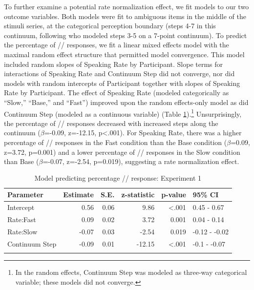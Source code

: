 To further examine a potential rate normalization effect, we fit models to our two outcome variables. Both models were fit to ambiguous items in the middle of the stimuli series, at the categorical perception boundary (steps 4-7 in this continuum, following \citet{bidelmanAcousticNoiseVision2019} who modeled steps 3-5 on a 7-point continuum). To predict the percentage of /\textesh/ responses, we fit a linear mixed effects model with the maximal random effect structure that permitted model convergence. This model included random slopes of Speaking Rate by Participant. Slope terms for interactions of Speaking Rate and Continuum Step did not converge, nor did models with random intercepts of Participant together with slopes of Speaking Rate by Participant. The effect of Speaking Rate (modeled categorically as ``Slow,'' ``Base,'' and ``Fast'') improved upon the random effects-only model as did Continuum Step (modeled as a continuous variable) (Table \ref{tab:exp1-sh-percen-model-summary}).\footnote{In the random effects, Continuum Step was modeled as three-way categorical variable; these models did not converge.} Unsurprisingly, the percentage of /\textesh/ responses decreased with increased steps along the continuum (\(\beta\)=-0.09, z=-12.15, p\textless.001). For Speaking Rate, there was a higher percentage of /\textesh/ responses in the Fast condition than the Base condition (\(\beta\)=0.09, z=3.72, p=0.001) and a lower percentage of /\textesh/ responses in the Slow condition than Base (\(\beta\)=-0.07, z=-2.54, p=0.019), suggesting a rate normalization effect.

\begin{table}
\caption{\label{tab:exp1-sh-percen-model-summary}Model predicting percentage /\textesh/ response: Experiment 1}
\centering
\begin{tabular}[t]{lrrrrl}
\hline\noalign{\smallskip}
Parameter & Estimate & S.E. & z-statistic & p-value & 95\% CI\\
\hline\noalign{\smallskip}
Intercept & 0.56 & 0.06 & 9.86 & <.001 & 0.45 - 0.67\\
Rate:Fast & 0.09 & 0.02 & 3.72 & 0.001 & 0.04 - 0.14\\
Rate:Slow & -0.07 & 0.03 & -2.54 & 0.019 & -0.12 - -0.02\\
Continuum Step & -0.09 & 0.01 & -12.15 & <.001 & -0.1 - -0.07\\
\hline\noalign{\smallskip}
\end{tabular}
\end{table}


